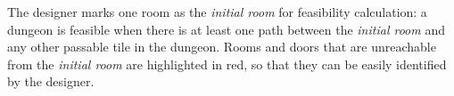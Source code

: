 
The designer marks one room as the \textit{initial room} for feasibility calculation: a dungeon is feasible when there is at least one path between the \textit{initial room} and any other passable tile in the dungeon. Rooms and doors that are unreachable from the \textit{initial room} are highlighted in red, so that they can be easily identified by the designer.




